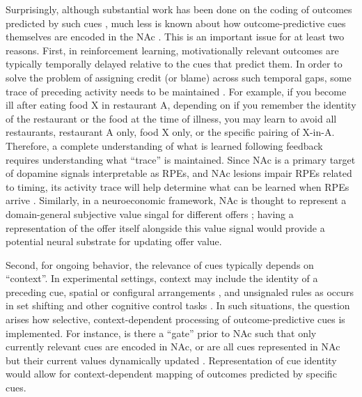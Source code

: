 \documentclass[11pt]{article}
\let\cite=\citep
\providecommand{\DIFadd}[1]{{\protect\color{red} \sf #1}} %
\providecommand{\DIFdel}[1]{} %
\providecommand{\DIFaddbegin}{} %
\providecommand{\DIFaddend}{} %
\providecommand{\DIFdelbegin}{} %
\providecommand{\DIFdelend}{} %
\newcommand{\DIFscaledelfig}{0.5}
\newlength{\DIFdelgraphicswidth} %
\newlength{\DIFdelgraphicsheight} %
\newcommand{\DIFaddincludegraphics}[2][]{{\color{red}\fbox{\DIFOincludegraphics[#1]{#2}}}} %
\newcommand{\DIFdelincludegraphics}[2][]{%
\sbox{\DIFdelgraphicsbox}{\DIFOincludegraphics[#1]{#2}}%
\settoboxwidth{\DIFdelgraphicswidth}{\DIFdelgraphicsbox} %
\settoboxtotalheight{\DIFdelgraphicsheight}{\DIFdelgraphicsbox} %
\scalebox{\DIFscaledelfig}{%
\parbox[b]{\DIFdelgraphicswidth}{\usebox{\DIFdelgraphicsbox}\\[-\baselineskip] \rule{\DIFdelgraphicswidth}{0em}}\llap{\resizebox{\DIFdelgraphicswidth}{\DIFdelgraphicsheight}{%
\setlength{\unitlength}{\DIFdelgraphicswidth}%
\begin{picture}(1,1)%
\thicklines\linethickness{2pt} %
{\color[rgb]{1,0,0}\put(0,0){\framebox(1,1){}}}%
{\color[rgb]{1,0,0}\put(0,0){\line( 1,1){1}}}%
{\color[rgb]{1,0,0}\put(0,1){\line(1,-1){1}}}%
\end{picture}%
}\hspace*{3pt}}} %
} %
\DeclareRobustCommand{\DIFaddbegin}{\DIFOaddbegin \let\includegraphics\DIFaddincludegraphics} %
\DeclareRobustCommand{\DIFaddend}{\DIFOaddend \let\includegraphics\DIFOincludegraphics} %
\DeclareRobustCommand{\DIFdelbegin}{\DIFOdelbegin \let\includegraphics\DIFdelincludegraphics} %
\DeclareRobustCommand{\DIFdelend}{\DIFOaddend \let\includegraphics\DIFOincludegraphics} %
\begin{document}
Surprisingly, although substantial work has been done on the coding of
outcomes predicted by such cues
\DIFdelbegin \DIFdel{\cite{Hollerman1998,Setlow2003,Nicola2004,Roitman2005,Day2006,Roesch2009a,Saddoris2011,Goldstein2012,Lansink2012,Bissonette2013,McGinty2013,Atallah2014,Sugam2014,Cooch2015,West2016}}\DIFdelend \DIFaddbegin \DIFadd{\cite{Schultz1992,Hollerman1998,Hassani2001,Cromwell2003,Setlow2003,Nicola2004,Roitman2005,Day2006,Roesch2009a,Saddoris2011,Goldstein2012,Lansink2012,Bissonette2013,McGinty2013,Atallah2014,Sugam2014,Cooch2015,West2016}}\DIFaddend ,
much less is known about how outcome-predictive cues themselves are
encoded in the NAc \cite[but see;][]{Sleezer2016}. This is an
important issue for at least two reasons. First, in reinforcement
learning, motivationally relevant outcomes are typically temporally
delayed relative to the cues that predict them. In order to solve the
problem of assigning credit (or blame) across such temporal gaps, some
trace of preceding activity needs to be maintained
\cite{sutton1998,Lee2012}. For example, if you become ill after eating
food X in restaurant A, depending on if you remember the identity of
the restaurant or the food at the time of illness, you may learn to
avoid all restaurants, restaurant A only, food X only, or the specific
pairing of X-in-A. Therefore, a complete understanding of what is
learned following feedback requires understanding what “trace” is
maintained. Since NAc is a primary target of \DIFdelbegin \DIFdel{DA }\DIFdelend \DIFaddbegin \DIFadd{dopamine }\DIFaddend signals interpretable
as RPEs, and NAc lesions impair RPEs related to timing, its activity
trace will help determine what can be learned when RPEs arrive
\cite{Ikemoto2007,McDannald2011,Hart2014,Hamid2016,Takahashi2016}. \DIFaddbegin \DIFadd{Similarly,
in a neuroeconomic framework, NAc is thought to represent a
domain-general subjective value singal for different offers
\cite{Peters2009,Levy2012,Bartra2013,Sescousse2015}; having a representation of
the offer itself alongside this value signal would provide a potential neural substrate for updating offer
value.
}\DIFaddend 

Second, for ongoing behavior, the relevance of cues typically depends
on “context”. In experimental settings, context may include the
identity of a preceding cue, spatial or configural arrangements
\cite{Holland1992,Bouton1993,Honey2014}, and unsignaled rules as
occurs in set shifting and other cognitive control tasks
\cite{Grant1948,cohen1992context,Floresco2006a,Sleezer2016}. In such
situations, the question arises how selective, context-dependent
processing of outcome-predictive cues is implemented. For instance, is
there a “gate” prior to NAc such that only currently relevant cues are
encoded in NAc, or are all cues represented in NAc but their current
values dynamically updated
\cite{Goto2008,Fitzgerald2014,Sleezer2016}. Representation of cue
identity would allow for context-dependent mapping of outcomes
predicted by specific cues.
\end{document}

